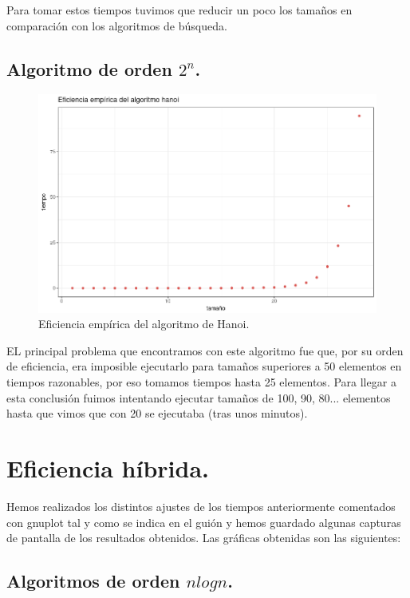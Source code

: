 \documentclass[a4paper, 11pt]{article}
\begin{document}
Para tomar estos tiempos tuvimos que reducir un poco los tamaños en comparación con los algoritmos de búsqueda.

\pagebreak
\subsection{Algoritmo de orden $2^n$.}

\begin{figure}[!hbp]
	\includegraphics[width=\textwidth]{hanoi_empirica.png}
	\caption{Eficiencia empírica del algoritmo de Hanoi.\label{hanoiemp}}
\end{figure}

EL principal problema que encontramos con este algoritmo fue que, por su orden de eficiencia, era imposible ejecutarlo para tamaños superiores a 50 elementos en tiempos razonables, por eso tomamos tiempos hasta 25 elementos. Para llegar a esta conclusión fuimos intentando ejecutar tamaños de 100, 90, 80... elementos hasta que vimos que con 20 se ejecutaba (tras unos minutos). 
\pagebreak
\section{Eficiencia híbrida.}
Hemos realizados los distintos ajustes de los tiempos anteriormente comentados con gnuplot tal y como se indica en el guión y hemos guardado algunas capturas de pantalla de los resultados obtenidos. Las gráficas obtenidas son las siguientes:

\subsection{Algoritmos de orden $nlogn$.}
\end{document}
